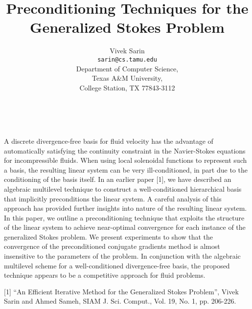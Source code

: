 \documentclass[11pt]{article}
\date{ ~ \hspace{-4mm}}
\title{Preconditioning Techniques for the Generalized Stokes Problem  }
\author{Vivek Sarin \\ {\tt  sarin@cs.tamu.edu} \\ Department of Computer Science,  \\  Texas A\&M University,  \\  College Station, TX 77843-3112  \\}
\begin{document}
\maketitle
\thispagestyle{empty}





 



A discrete divergence-free basis for fluid velocity has the advantage
of automatically satisfying the continuity constraint in the
Navier-Stokes equations for incompressible fluids. When using local
solenoidal functions to represent such a basis, the resulting linear
system can be very ill-conditioned, in part due to the conditioning of
the basis itself. In an earlier paper [1], we have described an
algebraic multilevel technique to construct a well-conditioned
hierarchical basis that implicitly preconditions the linear system. A
careful analysis of this approach has provided further insights into
nature of the resulting linear system.  In this paper, we outline a
preconditioning technique that exploits the structure of the linear
system to achieve near-optimal convergence for each instance of the
generalized Stokes problem.  We present experiments to show that the
convergence of the preconditioned conjugate gradients method is almost
insensitive to the parameters of the problem.  In conjunction with the
algebraic multilevel scheme for a well-conditioned divergence-free
basis, the proposed technique appears to be a competitive approach for
fluid problems.  




[1] ``An Efficient Iterative Method for the Generalized Stokes 
Problem'', Vivek Sarin and Ahmed Sameh, 
SIAM J. Sci. Comput., Vol. 19, No. 1, pp. 206-226.
\end{document}
